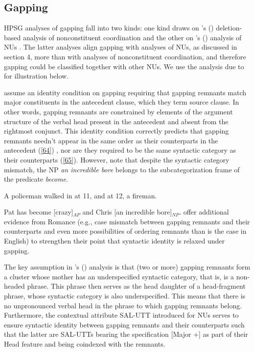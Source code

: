 \documentclass[output=paper
                ,modfonts
                ,nonflat
	        ,collection
	        ,collectionchapter
	        ,collectiontoclongg
 	        ,biblatex
                ,babelshorthands
                ,newtxmath
                ,draftmode
                ,colorlinks, citecolor=brown
]{./langsci/langscibook}
\begin{document}
{\subsection{Gapping}
HPSG analyses of gapping fall into two kinds: one kind draws on \citeauthor{Beavers2004}'s (\citeyear{Beavers2004}) deletion-based analysis of nonconstituent coordination \citep{Chaves2009} and the other on \citeauthor{Ginzburg2000}'s (\citeyear{Ginzburg2000}) analysis of NUs \citep{Abeille2014, Park2018}. The latter analyses align gapping with analyses of NUs, as discussed in section 4, more than with analyses of nonconstituent coordination, and therefore gapping could be classified together with other NUs. We use the analysis due to \citet{Abeille2014} for illustration below.

\citet{Abeille2014} assume an identity condition on gapping requiring that gapping remnants match major constituents in the antecedent clause, which they term source clause. In other words, gapping remnants are constrained by elements of the argument structure of the verbal head present in the antecedent and absent from the rightmost conjunct. %
This identity condition correctly predicts that gapping remnants needn't appear in the same order as their counterparts in the antecedent (\ref{64}) \citep[see][156--158]{Sag1985}, nor are they required to be the same syntactic category as their counterparts (\ref{65}). However, note that despite the syntactic category mismatch, the NP {\it an incredible bore} belongs to the subcategorization frame of the predicate {\it become}.

\ea A policeman walked in at 11, and at 12, a fireman. \label{64}\z

\ea Pat has become [crazy]$_{AP}$ and Chris [an incredible bore]$_{NP}$.  \label{65}\z
\citet{Abeille2014} offer additional evidence from Romance (e.g., case mismatch between gapping remnants and their counterparts and even more possibilities of ordering remnants than is the case in English) to strengthen their point that syntactic identity is relaxed under gapping.


The key assumption in \citeauthor{Abeille2014}'s (\citeyear{Abeille2014}) analysis is that (two or more) gapping remnants form a cluster whose mother has an underspecified syntactic category, that is, is a non-headed phrase. This phrase then serves as the head daughter of a head-fragment phrase, whose syntactic category is also underspecified. This means that there is no unpronounced verbal head in the phrase to which gapping remnants belong. Furthermore, the contextual attribute SAL-UTT introduced for NUs serves to ensure syntactic identity between gapping remnants and their counterparts such that the latter are SAL-UTTs bearing the specification [Major +] as part of their Head feature and being coindexed with the remnants.

}
\end{document}
